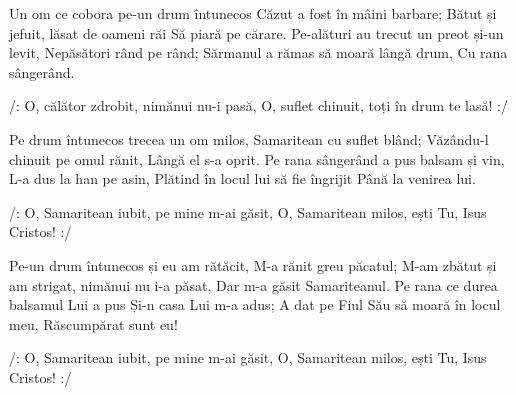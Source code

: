 \beginverse
Un om ce cobora pe-un drum întunecos
Căzut a fost în mâini barbare;
Bătut și jefuit, lăsat de oameni răi
Să piară pe cărare.
Pe-alături au trecut un preot și-un levit,
Nepăsători rând pe rând;
Sărmanul a rămas să moară lângă drum,
Cu rana sângerând.
\endverse

\beginchorus
/: O, călător zdrobit, nimănui nu-i pasă,
O, suflet chinuit, toți în drum te lasă! :/
\endchorus

\beginverse
Pe drum întunecos trecea un om milos,
Samaritean cu suflet blând;
Văzându-l chinuit pe omul rănit,
Lângă el s-a oprit.
Pe rana sângerând a pus balsam și vin,
L-a dus la han pe asin,
Plătind în locul lui să fie îngrijit
Până la venirea lui.
\endverse

\beginchorus
/: O, Samaritean iubit, pe mine m-ai găsit,
O, Samaritean milos, ești Tu, Isus Cristos! :/
\endchorus

\beginverse
Pe-un drum întunecos și eu am rătăcit,
M-a rănit greu păcatul;
M-am zbătut și am strigat, nimănui nu i-a păsat,
Dar m-a găsit Samariteanul.
Pe rana ce durea balsamul Lui a pus
Și-n casa Lui m-a adus;
A dat pe Fiul Său să moară în locul meu,
Răscumpărat sunt eu!
\endverse

\beginchorus
/: O, Samaritean iubit, pe mine m-ai găsit,
O, Samaritean milos, ești Tu, Isus Cristos! :/
\endchorus
\endsong